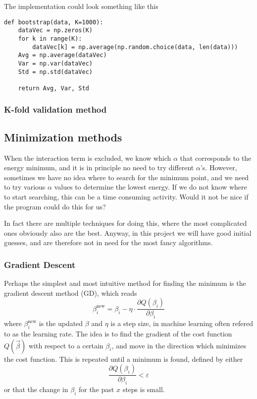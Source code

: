 The implementation could look something like this
\lstset{basicstyle=\scriptsize}
\begin{lstlisting}
def bootstrap(data, K=1000):
    dataVec = np.zeros(K)
    for k in range(K):
        dataVec[k] = np.average(np.random.choice(data, len(data)))
    Avg = np.average(dataVec)
    Var = np.var(dataVec)
    Std = np.std(dataVec)
    
    return Avg, Var, Std
\end{lstlisting}

\subsubsection{K-fold validation method} \label{sec:kfold}


\subsection{Minimization methods} \label{sec:minimization}
When the interaction term is excluded, we know which $\alpha$ that corresponds to the energy minimum, and it is in principle no need to try different $\alpha$'s. However, sometimes we have no idea where to search for the minimum point, and we need to try various $\alpha$ values to determine the lowest energy. If we do not know where to start searching, this can be a time consuming activity. Would it not be nice if the program could do this for us?

In fact there are multiple techniques for doing this, where the most complicated ones obviously also are the best. Anyway, in this project we will have good initial guesses, and are therefore not in need for the most fancy algorithms. 

\subsubsection{Gradient Descent} \label{sec:gd}
Perhaps the simplest and most intuitive method for finding the minimum is the gradient descent method (GD), which reads
\begin{equation}
\label{eq:GD}
\beta_i^{\text{new}}=\beta_i - \eta\cdot\frac{\partial Q(\beta_i)}{\partial\beta_i}
\end{equation}
where $\beta_i^{\text{new}}$ is the updated $\beta$ and $\eta$ is a step size, in machine learning often refered to as the learning rate. The idea is to find the gradient of the cost function $Q(\vec{\beta})$ with respect to a certain $\beta_i$, and move in the direction which minimizes the cost function. This is repeated until a minimum is found, defined by either
\begin{equation}
\frac{\partial Q(\beta_i)}{\partial\beta_i}<\varepsilon
\end{equation}
or that the change in $\beta_i$ for the past $x$ steps is small. 
\par 
\vspace{3mm}


